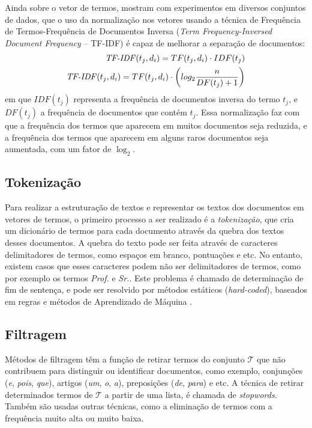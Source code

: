 \documentclass[
    12pt,                %
    oneside,            %
    a4paper,            %
    english,            %
    brazil                %
    ]{abntex2ppgsi}
\begin{document}
\begin{apendicesenv}
Ainda sobre o vetor de termos,  mostram com experimentos em diversos conjuntos de dados, que o uso da normalização nos vetores usando a técnica de Frequência de Termos-Frequência de Documentos Inversa (\textit{Term Frequency-Inversed Document Frequency} -- TF-IDF) é capaz de melhorar a separação de documentos:
\begin{equation}
\begin{split}
    \text{\textit{TF-IDF}}(t_j, d_i) = TF(t_j, d_i) \cdot IDF(t_j) \\
    \text{\textit{TF-IDF}}(t_j, d_i) = TF(t_j, d_i) \cdot \left( log_{2} \frac{n}{DF(t_j) + 1} \right)
\end{split}
\end{equation}
em que $IDF(t_j)$ representa a frequência de documentos inversa do termo $t_j$, e $DF(t_j)$ a frequência de documentos que contém $t_j$. Essa normalização faz com que a frequência dos termos que aparecem em muitos documentos seja reduzida, e a frequência dos termos que aparecem em alguns raros documentos seja aumentada, com um fator de $\log_{2}$.


\subsection{Tokenização}

Para realizar a estruturação de textos e representar os textos dos documentos em vetores de termos, o primeiro processo a ser realizado é a \textit{tokenização}, que cria um dicionário de termos para cada documento através da quebra dos textos desses documentos.
A quebra do texto pode ser feita através de caracteres delimitadores de termos, como espaços em branco, pontuações e etc. No entanto, existem casos que esses caracteres podem não ser delimitadores de termos, como por exemplo os termos \textit{Prof.} e \textit{Sr.}.
Este problema é chamado de determinação de fim de sentença, e pode ser resolvido por métodos estáticos (\textit{hard-coded}), baseados em regras e métodos de Aprendizado de Máquina \cite{Weiss2010}.

\subsection{Filtragem}

Métodos de filtragem têm a função de retirar termos do conjunto $\mathcal{T}$ que não contribuem para distinguir ou identificar documentos, como exemplo, conjunções (\textit{e}, \textit{pois}, \textit{que}), artigos (\textit{um}, \textit{o}, \textit{a}), preposições (\textit{de}, \textit{para}) e etc.
A técnica de retirar determinados termos de $\mathcal{T}$ a partir de uma lista, é chamada de \textit{stopwords}.
Também são usadas outras técnicas, como a eliminação de termos com a frequência muito alta ou muito baixa.


\end{apendicesenv}
\end{document}
